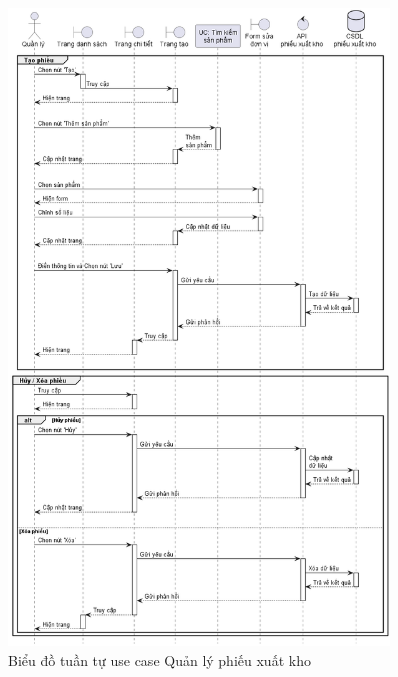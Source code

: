 \documentclass[../DoAn.tex]{subfiles}
\begin{document}
\begin{figure}[H]
    \centering
    \includegraphics[width=0.9\textwidth]{Hinhve/sequences/ExportReportManage.png}
    \caption{Biểu đồ tuần tự use case Quản lý phiếu xuất kho}
    \label{figure:sd-exportreport-manage}
\end{figure}
\break
\end{document}
